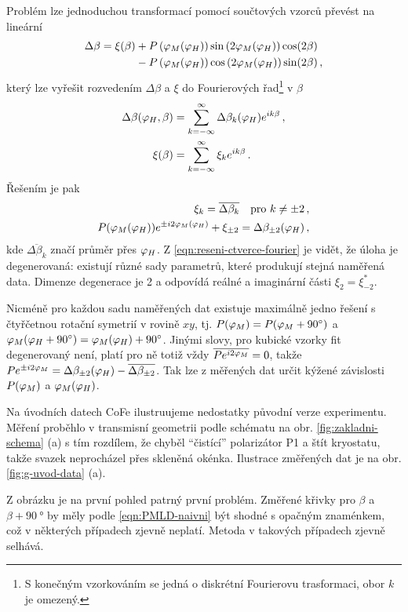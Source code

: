 Problém lze jednoduchou transformací pomocí součtových vzorců převést na lineární
\begin{align}
\label{eqn:PMLD-linearizovane}
\Delta\beta =\xi(\beta) &+ P\left(\varphi_M(\varphi_H)\right)\sin\left(2\varphi_M(\varphi_H)\right)\cos(2\beta) 
           \\&-P\left(\varphi_M(\varphi_H)\right)\cos\left(2\varphi_M(\varphi_H)\right)\sin(2\beta) \,,
\end{align}
který lze vyřešit rozvedením $\Delta\beta$ a $\xi$ do Fourierových řad\footnote{S konečným vzorkováním se jedná o diskrétní Fourierovu trasformaci, obor $k$ je omezený.} v $\beta$
\begin{align}
    \Delta\beta(\varphi_H, \beta) &= \sum_{k=-\infty}^\infty \Delta\beta_k(\varphi_H) e^{ik\beta} \,,\\
    \xi(\beta) &= \sum_{k=-\infty}^\infty \xi_k e^{ik\beta}  \,.
\end{align}
Řešením je pak
\begin{align}
    \xi_k = \overline{\Delta\beta_{k}} \quad \textrm{pro} \,\, k\neq\pm2 \,,\\
    P(\varphi_M(\varphi_H)) e^{\pm i2\varphi_M(\varphi_H)} + \xi_{\pm2} = \Delta\beta_{\pm2}(\varphi_H) \,,\label{eqn:reseni-ctverce-fourier}
\end{align}
kde $\overline{\Delta\beta_k}$ značí průměr přes $\varphi_H$.
Z \eqref{eqn:reseni-ctverce-fourier} je vidět, že úloha je degenerovaná: existují různé sady parametrů, které produkují stejná naměřená data.
Dimenze degenerace je 2 a odpovídá reálné a imaginární části $\xi_2=\xi_{-2}^*$.

Nicméně pro každou sadu naměřených dat existuje maximálně jedno řešení s čtyřčetnou rotační symetrií v rovině $xy$, tj. $P(\varphi_M)=P(\varphi_M+\SI{90}{\degree})$ a $\varphi_M(\varphi_H+\SI{90}{\degree})=\varphi_M(\varphi_H)+\SI{90}{\degree}$.
Jinými slovy, pro kubické vzorky fit degenerovaný není, platí pro ně totiž vždy $\overline{Pe^{i2\varphi_M}}=0$, takže $Pe^{\pm i2\varphi_M}=\Delta\beta_{\pm2}(\varphi_H)-\overline{\Delta\beta_{\pm2}}$.
Tak lze z měřených dat určit kýžené závislosti $P(\varphi_M)$ a $\varphi_M(\varphi_H)$.

Na úvodních datech CoFe ilustruujeme nedostatky původní verze experimentu.
Měření proběhlo v transmisní geometrii podle schématu na obr. \ref{fig:zakladni-schema} (a) s tím rozdílem, že chyběl ``čistící'' polarizátor P1 a štít kryostatu, takže svazek neprocházel přes skleněná okénka.
Ilustrace změřených dat je na obr. \ref{fig:g-uvod-data} (a).

Z obrázku je na první pohled patrný první problém.
Změřené křivky pro $\beta$ a $\beta+\SI{90}{\degree}$ by měly podle \eqref{eqn:PMLD-naivni} být shodné s opačným znaménkem, což v některých případech zjevně neplatí.
Metoda v takových případech zjevně selhává.

